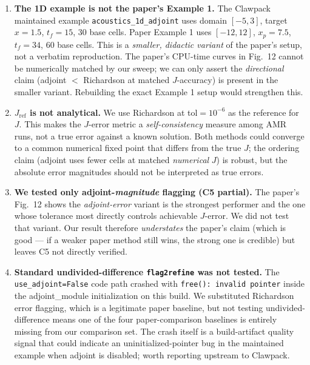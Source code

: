 \documentclass[11pt]{article}
\begin{document}
\begin{enumerate}

\item \textbf{The 1D example is not the paper's Example 1.} The Clawpack
maintained example \texttt{acoustics\_1d\_adjoint} uses
domain $[-5, 3]$, target $x=1.5$, $t_f=15$, 30 base cells. Paper Example 1 uses
$[-12, 12]$, $x_p = 7.5$, $t_f = 34$, 60 base cells. This is a
\emph{smaller, didactic variant} of the paper's setup, not a verbatim
reproduction. The paper's CPU-time curves in Fig.~12 cannot be
numerically matched by our sweep; we can only assert the \emph{directional}
claim (adjoint $<$ Richardson at matched $J$-accuracy) is present in the
smaller variant. Rebuilding the exact Example 1 setup would strengthen this.

\item \textbf{$J_{\text{ref}}$ is not analytical.} We use Richardson at
tol$=10^{-6}$ as the reference for $J$. This makes the $J$-error metric a
\emph{self-consistency} measure among AMR runs, not a true error against a
known solution. Both methods could converge to a common numerical fixed point
that differs from the true $J$; the ordering claim (adjoint uses fewer cells at
matched \emph{numerical} $J$) is robust, but the absolute error magnitudes
should not be interpreted as true errors.

\item \textbf{We tested only adjoint-\emph{magnitude} flagging (C5 partial).}
The paper's Fig.~12 shows the \emph{adjoint-error} variant is the strongest
performer and the one whose tolerance most directly controls achievable
$J$-error. We did not test that variant. Our result therefore
\emph{understates} the paper's claim (which is good --- if a weaker paper
method still wins, the strong one is credible) but leaves C5 not directly
verified.

\item \textbf{Standard undivided-difference \texttt{flag2refine} was not
tested.} The \texttt{use\_adjoint=False} code path crashed with
\texttt{free(): invalid pointer} inside the adjoint\_module initialization on
this build. We substituted Richardson error flagging, which is a legitimate
paper baseline, but not testing undivided-difference means one of the four
paper-comparison baselines is entirely missing from our comparison set. The
crash itself is a build-artifact quality signal that could indicate an
uninitialized-pointer bug in the maintained example when adjoint is disabled;
worth reporting upstream to Clawpack.


\end{enumerate}
\end{document}
